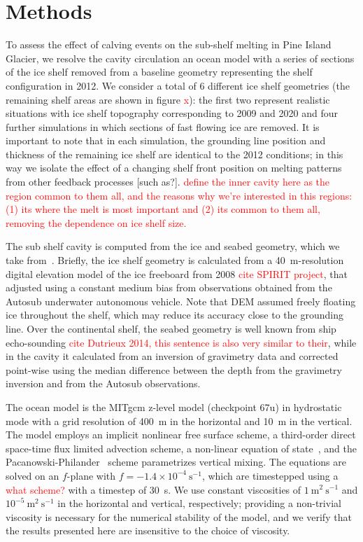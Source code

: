 \documentclass[draft]{agujournal2019}
\newcommand{\red}[1]{\textcolor{red}{#1}}
\begin{document}
\section{Methods}
To assess the effect of calving events on the sub-shelf melting in Pine Island Glacier, we resolve the cavity circulation an ocean model with a series of sections of the ice shelf removed from a baseline geometry representing the shelf configuration in 2012. We consider a total of 6 different ice shelf geometries (the remaining shelf areas are shown in figure \red{x}): the first two represent realistic situations with ice shelf topography corresponding to 2009 and 2020 and four further simulations in which sections of fast flowing ice are removed. It is important to note that in each simulation, the grounding line position and thickness of the remaining ice shelf are identical to the 2012 conditions; in this way we isolate the effect of a changing shelf front position on melting patterns from other feedback processes [such as?]. \red{define the inner cavity here as the region common to them all, and the reasons why we're interested in this regions: (1) its where the melt is most important and (2) its common to them all, removing the dependence on ice shelf size.}

The sub shelf cavity is computed from the ice and seabed geometry, which we take from~. Briefly, the ice shelf geometry is calculated from a 40~m-resolution digital elevation model of the ice freeboard from 2008 \red{cite SPIRIT project}, that adjusted using a constant medium bias from observations obtained from the Autosub underwater autonomous vehicle. Note that DEM assumed freely floating ice throughout the shelf, which may reduce its accuracy close to the grounding line. Over the continental shelf, the seabed geometry is well known from ship echo-sounding \red{cite Dutrieux 2014, this sentence is also very similar to their}, while in the cavity it calculated from an inversion of gravimetry data and corrected point-wise using the median difference between the depth from the gravimetry inversion and from the Autosub observations. 

The ocean model is the MITgcm z-level model (checkpoint 67u) in hydrostatic mode with a grid resolution of 400~m in the horizontal and 10~m in the vertical. The model employs an implicit nonlinear free surface scheme, a third-order direct space-time flux limited advection scheme, a non-linear equation of state~, and the Pacanowski-Philander~\cite{Pacanowski1981JPhysOcean} scheme parametrizes vertical mixing. The equations are solved on an $f$-plane with $f = -1.4\times10^{-4}~\text{s}^{-1}$, which are timestepped using a \red{what scheme?} with a timestep of 30~s. We use constant viscosities of $1~\text{m}^2~\text{s}^{-1}$ and $10^{-5}~\text{m}^2~\text{s}^{-1}$ in the horizontal and vertical, respectively; providing a non-trivial viscosity is necessary for the numerical stability of the model, and we verify that the results presented here are insensitive to the choice of viscosity.
\end{document}
